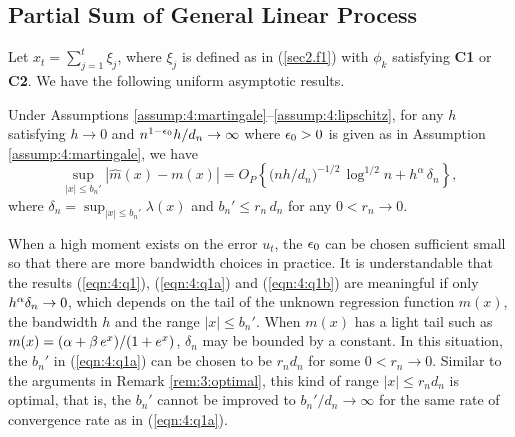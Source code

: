 \subsection{Partial Sum of General Linear Process}

Let $x_t=\sum_{j=1}^t\xi_j$, where $\xi_j$ is defined as in (\ref {sec2.f1}) with $\phi_k$ satisfying {\bf C1} or {\bf C2}. We have the following uniform asymptotic results.

\begin{thm}  Under Assumptions \ref{assump:4:martingale}--\ref{assump:4:lipschitz},
for any $h$ satisfying $h\to 0$ and $n^{1-\epsilon_0}h/d_n\to \infty$ where $\epsilon_0>0$ is given as in Assumption \ref{assump:4:martingale}, we have
\begin{equation}
\sup_{|x|\le b_n'}|\hat{m}(x)-m(x)|=
O_{P}\left\{\big(nh/d_n\big)^{-1/2}\,\log^{1/2}n
+h^{\alpha}\, \delta_n\right\},
\label{eqn:4:q1b}\end{equation}
where $\delta_n=\sup_{|x|\le b_n'}\lambda(x)$ and $b_n'\le r_n\,d_n $ for any  $0< r_n \to 0$.
\end{thm}


\begin{rem} When a high moment exists on the error $u_t$,
the $\epsilon_0$ can be chosen sufficient small so that there are more bandwidth choices  in practice. It is understandable that the results (\ref {eqn:4:q1}), (\ref {eqn:4:q1a}) and (\ref {eqn:4:q1b}) are meaningful if only $h^{\alpha}\delta_n\to 0$, which depends on the tail of the unknown regression function $m(x)$, the bandwidth $h$ and the range $|x|\le b_n'$.
When $m(x)$ has a light tail such as $m(x)=(\alpha+\beta\, e^{x})/(1+e^x)$, $\delta_n$ may be bounded by a constant. In this situation, the $b_n'$ in (\ref {eqn:4:q1a}) can be chosen to be $r_n d_n$ for some $0<r_n\to 0$. Similar to the arguments in Remark \ref{rem:3:optimal}, this kind of range $|x|\le r_n d_n$ is optimal, that is, the $b_n'$ cannot be improved  to $b_n' / d_n \to \infty$ for the same rate of convergence rate as in (\ref {eqn:4:q1a}).

\end{rem}

